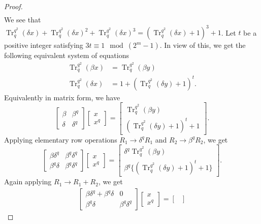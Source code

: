 \documentclass{birkjour}
\theoremstyle{definition}
\theoremstyle{remark}
\numberwithin{equation}{section}
\begin{document}
\begin{proof}
\begin{align*}
\end{align*}
We see that $\operatorname{Tr}_q^{q^2}(\delta x)+\operatorname{Tr}_q^{q^2}(\delta x)^2+\operatorname{Tr}_q^{q^2}(\delta x)^3=(\operatorname{Tr}_q^{q^2}(\delta x)+1)^3+1$.
Let $t$ be a positive integer satisfying $3t\equiv 1\mod{(2^m-1)}$. In view of this, we get the following equivalent system of equations
\begin{align}
	\operatorname{Tr}_q^{q^2}(\beta x)&=\operatorname{Tr}_q^{q^2}(\beta y)\label{4g}\\
	\operatorname{Tr}_q^{q^2}(\delta x)&=1+(\operatorname{Tr}_q^{q^2}(\delta y)+1)^{t}.\label{4h}
\end{align}
Equivalently in matrix form, we have
$$\begin{bmatrix}
	\beta&\beta^{q}\\
	\delta&\delta^{q}
\end{bmatrix}
\begin{bmatrix}
	x\\x^{q}
\end{bmatrix}=
\begin{bmatrix}
	\operatorname{Tr}_{q}^{q^2}(\beta y)\\
	(\operatorname{Tr}_q^{q^2}(\delta y)+1)^t+1
\end{bmatrix}.$$
Applying elementary row operations $R_1\rightarrow\delta^{q}R_1$ and $R_2\rightarrow\beta^{q}R_2$, we get
$$\begin{bmatrix}
	\beta\delta^{q}&\beta^{q}\delta^{q}\\
	\beta^{q}\delta&\beta^{q}\delta^{q}
\end{bmatrix}
\begin{bmatrix}
	x\\x^{q}
\end{bmatrix}=
\begin{bmatrix}
	\delta^{q}\operatorname{Tr}_{q}^{q^2}(\beta y)\\
	\beta^{q}\{(\operatorname{Tr}_q^{q^2}(\delta y)+1)^t+1\}
\end{bmatrix}.$$
Again applying $R_1\rightarrow R_1+R_2$, we get
\begin{align}\begin{bmatrix}
		\beta\delta^{q}+\beta^{q}\delta&0\\
		\beta^{q}\delta&\beta^{q}\delta^{q}
	\end{bmatrix}
	\begin{bmatrix}
		x\\x^{q}
	\end{bmatrix}=
	\begin{bmatrix}

\end{bmatrix}
\end{align}
\end{proof}
\end{document}
